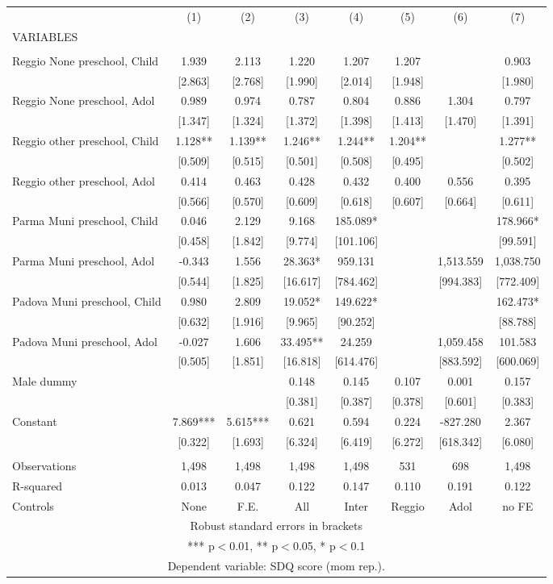 \begin{tabular}{lccccccc} \hline
 & (1) & (2) & (3) & (4) & (5) & (6) & (7) \\
VARIABLES &  &  &  &  &  &  &  \\ \hline
 &  &  &  &  &  &  &  \\
Reggio None preschool, Child & 1.939 & 2.113 & 1.220 & 1.207 & 1.207 &  & 0.903 \\
 & [2.863] & [2.768] & [1.990] & [2.014] & [1.948] &  & [1.980] \\
Reggio None preschool, Adol & 0.989 & 0.974 & 0.787 & 0.804 & 0.886 & 1.304 & 0.797 \\
 & [1.347] & [1.324] & [1.372] & [1.398] & [1.413] & [1.470] & [1.391] \\
Reggio other preschool, Child & 1.128** & 1.139** & 1.246** & 1.244** & 1.204** &  & 1.277** \\
 & [0.509] & [0.515] & [0.501] & [0.508] & [0.495] &  & [0.502] \\
Reggio other preschool, Adol & 0.414 & 0.463 & 0.428 & 0.432 & 0.400 & 0.556 & 0.395 \\
 & [0.566] & [0.570] & [0.609] & [0.618] & [0.607] & [0.664] & [0.611] \\
Parma Muni preschool, Child & 0.046 & 2.129 & 9.168 & 185.089* &  &  & 178.966* \\
 & [0.458] & [1.842] & [9.774] & [101.106] &  &  & [99.591] \\
Parma Muni preschool, Adol & -0.343 & 1.556 & 28.363* & 959.131 &  & 1,513.559 & 1,038.750 \\
 & [0.544] & [1.825] & [16.617] & [784.462] &  & [994.383] & [772.409] \\
Padova Muni preschool, Child & 0.980 & 2.809 & 19.052* & 149.622* &  &  & 162.473* \\
 & [0.632] & [1.916] & [9.965] & [90.252] &  &  & [88.788] \\
Padova Muni preschool, Adol & -0.027 & 1.606 & 33.495** & 24.259 &  & 1,059.458 & 101.583 \\
 & [0.505] & [1.851] & [16.818] & [614.476] &  & [883.592] & [600.069] \\
Male dummy &  &  & 0.148 & 0.145 & 0.107 & 0.001 & 0.157 \\
 &  &  & [0.381] & [0.387] & [0.378] & [0.601] & [0.383] \\
Constant & 7.869*** & 5.615*** & 0.621 & 0.594 & 0.224 & -827.280 & 2.367 \\
 & [0.322] & [1.693] & [6.324] & [6.419] & [6.272] & [618.342] & [6.080] \\
 &  &  &  &  &  &  &  \\
Observations & 1,498 & 1,498 & 1,498 & 1,498 & 531 & 698 & 1,498 \\
R-squared & 0.013 & 0.047 & 0.122 & 0.147 & 0.110 & 0.191 & 0.122 \\
 Controls & None & F.E. & All & Inter & Reggio & Adol & no FE \\ \hline
\multicolumn{8}{c}{ Robust standard errors in brackets} \\
\multicolumn{8}{c}{ *** p$<$0.01, ** p$<$0.05, * p$<$0.1} \\
\multicolumn{8}{c}{ Dependent variable: SDQ score (mom rep.).} \\
\end{tabular}
